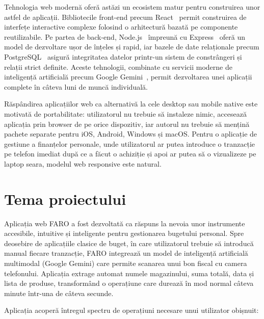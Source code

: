 \documentclass[12pt,a4paper,oneside]{report}
\begin{document}
Tehnologia web modernă oferă astăzi un ecosistem matur pentru construirea unor astfel de aplicații. Bibliotecile front-end precum React~\cite{ref:react} permit construirea de interfețe interactive complexe folosind o arhitectură bazată pe componente reutilizabile. Pe partea de back-end, Node.js~\cite{ref:nodejs} împreună cu Express~\cite{ref:express} oferă un model de dezvoltare ușor de înțeles și rapid, iar bazele de date relaționale precum PostgreSQL~\cite{ref:postgres} asigură integritatea datelor printr-un sistem de constrângeri și relații strict definite. Aceste tehnologii, combinate cu servicii moderne de inteligență artificială precum Google Gemini~\cite{ref:gemini}, permit dezvoltarea unei aplicații complete în câteva luni de muncă individuală.

Răspândirea aplicațiilor web ca alternativă la cele desktop sau mobile native este motivată de portabilitate: utilizatorul nu trebuie să instaleze nimic, accesează aplicația prin browser de pe orice dispozitiv, iar autorul nu trebuie să mențină pachete separate pentru iOS, Android, Windows și macOS. Pentru o aplicație de gestiune a finanțelor personale, unde utilizatorul ar putea introduce o tranzacție pe telefon imediat după ce a făcut o achiziție și apoi ar putea să o vizualizeze pe laptop seara, modelul web responsive este natural.

\section{Tema proiectului}

Aplicația web FARO a fost dezvoltată ca răspuns la nevoia unor instrumente accesibile, intuitive și inteligente pentru gestionarea bugetului personal. Spre deosebire de aplicațiile clasice de buget, în care utilizatorul trebuie să introducă manual fiecare tranzacție, FARO integrează un model de inteligență artificială multimodal (Google Gemini) care permite scanarea unui bon fiscal cu camera telefonului. Aplicația extrage automat numele magazinului, suma totală, data și lista de produse, transformând o operațiune care durează în mod normal câteva minute într-una de câteva secunde.

Aplicația acoperă întregul spectru de operațiuni necesare unui utilizator obișnuit:
\end{document}
